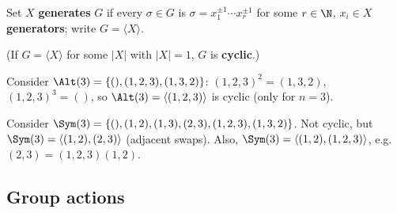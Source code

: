 \begin{slide}
    \begin{definition}[generator]
        \vspace{0pt}
        Set $X$ \textbf{generates} $G$ if every $\sigma \in G$ is $\sigma = x_1^{\pm 1} \dotsb x_r^{\pm 1}$ for some $r \in \N$, $x_i \in X$ \textbf{generators}; write $G = \langle X \rangle$. \pause

        (If $G = \langle X \rangle$ for some $|X|$ with $|X| = 1$, $G$ is \textbf{cyclic}.)
    \end{definition} \pause

    \begin{example}
        \vspace{0pt}
        Consider $\Alt(3) = \{(),(1,2,3),(1,3,2)\}$: $(1,2,3)^2 = (1,3,2)$, $(1,2,3)^3 = ()$, so $\Alt(3) = \langle(1,2,3)\rangle$ is cyclic (only for $n = 3$).
    \end{example}

    \begin{example}
        \vspace{0pt}
        Consider $\Sym(3) = \{(),(1,2),(1,3),(2,3),(1,2,3),(1,3,2)\}$. Not cyclic, but $\Sym(3) = \langle(1,2),(2,3)\rangle$ (adjacent swaps). Also, $\Sym(3) = \langle(1,2),(1,2,3)\rangle$, e.g. $(2,3) = (1,2,3)(1,2)$.
    \end{example}
\end{slide}

\subsection{Group actions}

